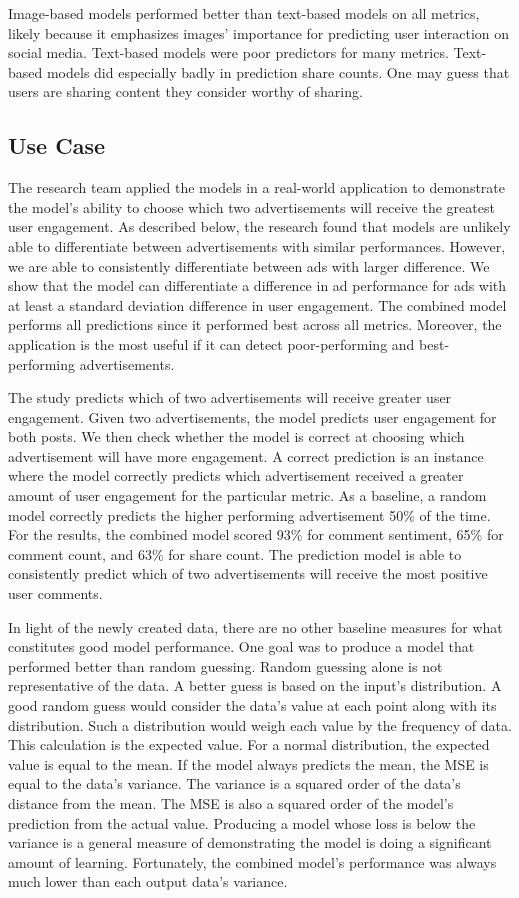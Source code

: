 \documentclass[mksc,blindrev]{informs3} %
\begin{document}
Image-based models performed better than text-based models on all metrics, likely because it emphasizes images' importance for predicting user interaction on social media. Text-based models were poor predictors for many metrics. Text-based models did especially badly in prediction share counts. One may guess that users are sharing content they consider worthy of sharing.

\subsection{Use Case}

The research team applied the models in a real-world application to demonstrate the model's ability to choose which two advertisements will receive the greatest user engagement. As described below, the research found that models are unlikely able to differentiate between advertisements with similar performances. However, we are able to consistently differentiate between ads with larger difference. We show that the model can differentiate a difference in ad performance for ads with at least a standard deviation difference in user engagement. The combined model performs all predictions since it performed best across all metrics. Moreover, the application is the most useful if it can detect poor-performing and best-performing advertisements.

The study predicts which of two advertisements will receive greater user engagement. Given two advertisements, the model predicts user engagement for both posts. We then check whether the model is correct at choosing which advertisement will have more engagement. A correct prediction is an instance where the model correctly predicts which advertisement received a greater amount of user engagement for the particular metric. As a baseline, a random model correctly predicts the higher performing advertisement 50\% of the time.  For the results, the combined model scored 93\% for comment sentiment, 65\% for comment count, and 63\% for share count. The prediction model is able to consistently predict which of two advertisements will receive the most positive user comments.

In light of the newly created data, there are no other baseline measures for what constitutes good model performance. One goal was to produce a model that performed better than random guessing. Random guessing alone is not representative of the data. A better guess is based on the input's distribution. A good random guess would consider the data's value at each point along with its distribution. Such a distribution would weigh each value by the frequency of data. This calculation is the expected value. For a normal distribution, the expected value is equal to the mean. If the model always predicts the mean, the MSE is equal to the data's variance. The variance is a squared order of the data's distance from the mean. The MSE is also a squared order of the model's prediction from the actual value. Producing a model whose loss is below the variance is a general measure of demonstrating the model is doing a significant amount of learning. Fortunately, the combined model's performance was always much lower than each output data's variance.
\end{document}
